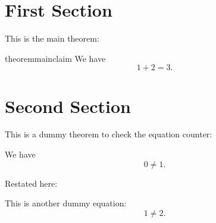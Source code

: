 \section{First Section}

This is the main theorem:
\begin{restatable}{theorem}{mainclaim}
    We have
    \begin{equation}
        1 + 2 = 3 .
    \end{equation}
\end{restatable}

\section{Second Section}

This is a dummy theorem to check the equation counter:
\begin{theorem} We have
    \begin{equation}
        0 \neq 1 .
    \end{equation}
\end{theorem}

Restated here:
\mainclaim*

This is another dummy equation:
\begin{equation}
    1 \neq 2 .
\end{equation}
